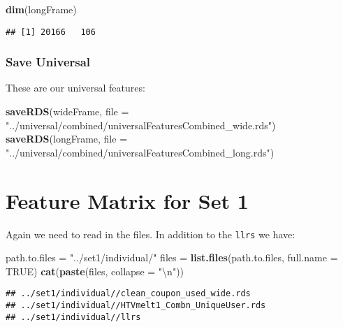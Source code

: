 \documentclass[10pt]{report}
\newenvironment{Shaded}{}{}
\newcommand{\KeywordTok}[1]{\textcolor[rgb]{0.00,0.44,0.13}{\textbf{{#1}}}}
\newcommand{\DataTypeTok}[1]{\textcolor[rgb]{0.56,0.13,0.00}{{#1}}}
\newcommand{\CharTok}[1]{\textcolor[rgb]{0.25,0.44,0.63}{{#1}}}
\newcommand{\StringTok}[1]{\textcolor[rgb]{0.25,0.44,0.63}{{#1}}}
\newcommand{\OtherTok}[1]{\textcolor[rgb]{0.00,0.44,0.13}{{#1}}}
\newcommand{\NormalTok}[1]{{#1}}
\begin{document}
\begin{Shaded}
\begin{Highlighting}[]
\KeywordTok{dim}\NormalTok{(longFrame)}
\end{Highlighting}
\end{Shaded}

\begin{verbatim}
## [1] 20166   106
\end{verbatim}

\subsubsection{Save Universal}\label{save-universal}

These are our universal features:

\begin{Shaded}
\begin{Highlighting}[]
\KeywordTok{saveRDS}\NormalTok{(wideFrame, }\DataTypeTok{file =} \StringTok{"../universal/combined/universalFeaturesCombined_wide.rds"}\NormalTok{)}
\KeywordTok{saveRDS}\NormalTok{(longFrame, }\DataTypeTok{file =} \StringTok{"../universal/combined/universalFeaturesCombined_long.rds"}\NormalTok{)}
\end{Highlighting}
\end{Shaded}

\section{Feature Matrix for Set 1}\label{feature-matrix-for-set-1}

Again we need to read in the files. In addition to the \verb!llrs! we
have:

\begin{Shaded}
\begin{Highlighting}[]
\NormalTok{path.to.files =}\StringTok{ "../set1/individual/"}
\NormalTok{files =}\StringTok{ }\KeywordTok{list.files}\NormalTok{(path.to.files, }\DataTypeTok{full.name =} \OtherTok{TRUE}\NormalTok{)}
\KeywordTok{cat}\NormalTok{(}\KeywordTok{paste}\NormalTok{(files, }\DataTypeTok{collapse =} \StringTok{"}\CharTok{\textbackslash{}n}\StringTok{"}\NormalTok{))}
\end{Highlighting}
\end{Shaded}

\begin{verbatim}
## ../set1/individual//clean_coupon_used_wide.rds
## ../set1/individual//HTVmelt1_Combn_UniqueUser.rds
## ../set1/individual//llrs
\end{verbatim}
\end{document}
